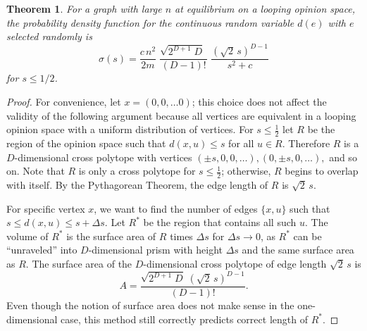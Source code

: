 \documentclass[a4paper,10pt]{article}
\newtheorem{theorem}{Theorem}
\begin{document}
\begin{theorem}
\label{thm:length-distro}
 For a graph with large $n$ at equilibrium on a looping opinion space, the probability density function for the continuous random variable $d(e)$ with $e$ selected randomly is
 \begin{equation}
 \sigma(s) = \frac{c\,n^2}{2m}\;\frac{\sqrt{2^{D+1}\;D} \;}{(D-1)!}\;\frac{(\sqrt{2}\,s)^{D-1}}{s^2 + c}
 \end{equation}
for $s \leq 1/2$.
\end{theorem}
\begin{proof}
For convenience, let $x = (0, 0, \ldots 0)$; this choice does not affect the validity of the following argument because all vertices are equivalent in a looping opinion space with a uniform distribution of vertices. For $s \leq \frac{1}{2}$ let $R$ be the region of the opinion space such that $d(x, u) \leq s$ for all $u \in R$. Therefore $R$ is a $D$-dimensional cross polytope with vertices $(\pm s, 0, 0, \ldots), (0, \pm s, 0, \ldots),$ and so on. Note that $R$ is only a cross polytope for $s \leq \frac{1}{2}$; otherwise, $R$ begins to overlap with itself. By the Pythagorean Theorem, the edge length of $R$ is $\sqrt{2}\,s$.

For specific vertex $x$, we want to find the number of edges $\{x, u\}$ such that $s \leq d(x, u) \leq s + \Delta s.$ Let $R^*$ be the region that contains all such $u$.  The volume of $R^*$ is the surface area of $R$ times $\Delta s$ for $\Delta s \to 0$, as $R^*$ can be ``unraveled'' into $D$-dimensional prism with height $\Delta s$ and the same surface area as $R$. The surface area of the $D$-dimensional cross polytope of edge length $\sqrt{2}\,s$ is
\begin{equation}
A = \frac{\sqrt{2^{D+1}\;D} \; (\sqrt{2}\,s)^{D-1}}{(D-1)!}.
\end{equation} 
Even though the notion of surface area does not make sense in the one-dimensional case, this method still correctly predicts correct length of $R^*$.


\end{proof}
\end{document}
